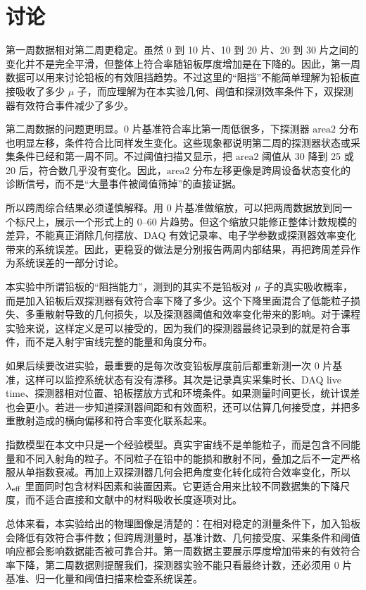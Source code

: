 \documentclass[aps,prl,twocolumn,superscriptaddress,nofootinbib]{revtex4-2}
\begin{document}
\section{讨论}

第一周数据相对第二周更稳定。虽然 0 到 10 片、10 到 20 片、20 到 30 片之间的变化并不是完全平滑，但整体上符合率随铅板厚度增加是在下降的。因此，第一周数据可以用来讨论铅板的有效阻挡趋势。不过这里的“阻挡”不能简单理解为铅板直接吸收了多少 $\mu$ 子，而应理解为在本实验几何、阈值和探测效率条件下，双探测器有效符合事件减少了多少。

第二周数据的问题更明显。0 片基准符合率比第一周低很多，下探测器 \(\mathrm{area2}\) 分布也明显左移，条件符合比同样发生变化。这些现象都说明第二周的探测器状态或采集条件已经和第一周不同。不过阈值扫描又显示，把 \(\mathrm{area2}\) 阈值从 30 降到 25 或 20 后，符合数几乎没有变化。因此，\(\mathrm{area2}\) 分布左移更像是跨周设备状态变化的诊断信号，而不是“大量事件被阈值筛掉”的直接证据。

所以跨周综合结果必须谨慎解释。用 0 片基准做缩放，可以把两周数据放到同一个标尺上，展示一个形式上的 0--60 片趋势。但这个缩放只能修正整体计数规模的差异，不能真正消除几何摆放、DAQ 有效记录率、电子学参数或探测器效率变化带来的系统误差。因此，更稳妥的做法是分别报告两周内部结果，再把跨周差异作为系统误差的一部分讨论。

本实验中所谓铅板的“阻挡能力”，测到的其实不是铅板对 $\mu$ 子的真实吸收概率，而是加入铅板后双探测器有效符合率下降了多少。这个下降里面混合了低能粒子损失、多重散射导致的几何损失，以及探测器阈值和效率变化带来的影响。对于课程实验来说，这样定义是可以接受的，因为我们的探测器最终记录到的就是符合事件，而不是入射宇宙线完整的能量和角度分布。

如果后续要改进实验，最重要的是每次改变铅板厚度前后都重新测一次 0 片基准，这样可以监控系统状态有没有漂移。其次是记录真实采集时长、DAQ live time、探测器相对位置、铅板摆放方式和环境条件。如果测量时间更长，统计误差也会更小。若进一步知道探测器间距和有效面积，还可以估算几何接受度，并把多重散射造成的横向偏移和符合率变化联系起来。

指数模型在本文中只是一个经验模型。真实宇宙线不是单能粒子，而是包含不同能量和不同入射角的粒子。不同粒子在铅中的能损和散射不同，叠加之后不一定严格服从单指数衰减。再加上双探测器几何会把角度变化转化成符合效率变化，所以 $\lambda_{\rm eff}$ 里面同时包含材料因素和装置因素。它更适合用来比较不同数据集的下降尺度，而不适合直接和文献中的材料吸收长度逐项对比。

总体来看，本实验给出的物理图像是清楚的：在相对稳定的测量条件下，加入铅板会降低有效符合事件数；但跨周测量时，基准计数、几何接受度、采集条件和阈值响应都会影响数据能否被可靠合并。第一周数据主要展示厚度增加带来的有效符合率下降，第二周数据则提醒我们，探测器实验不能只看最终计数，还必须用 0 片基准、归一化量和阈值扫描来检查系统误差。
\end{document}
